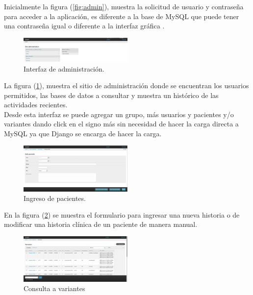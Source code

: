 Inicialmente la figura (\ref{fig:admin}), muestra la solicitud de usuario y contraseña para acceder a la aplicación, es diferente a la base de MySQL que puede tener  una contraseña igual o diferente a la interfaz gráfica .

\begin{figure}[h] 
	\centering
	\includegraphics[width=0.5\textwidth]{Kap3/django_admin}
	\caption{Interfaz de administración.} \label{fig:admin2}
\end{figure}

La figura (\ref{fig:admin2}), muestra el sitio de administración donde se encuentran los usuarios permitidos, las bases de datos a consultar y muestra un histórico de las actividades recientes. \\

Desde esta interfaz se puede agregar un grupo, más usuarios y pacientes y/o variantes dando click en el signo más sin necesidad de hacer la carga directa a MySQL ya que Django se encarga de hacer la carga. \\

\begin{figure}[h] 
	\centering
	\includegraphics[width=0.5\textwidth]{Kap3/ingresar_paciente}
	\caption{Ingreso de pacientes.} \label{fig:pacientes}
\end{figure}

En la figura (\ref{fig:pacientes}) se muestra el formulario para ingresar una nueva historia o de modificar una historia clínica de un paciente de manera manual.

\begin{figure}[h] 
	\centering
	\includegraphics[width=0.5\textwidth]{Kap3/consulta}
	\caption{Consulta a variantes} \label{fig:consulta}
\end{figure}


